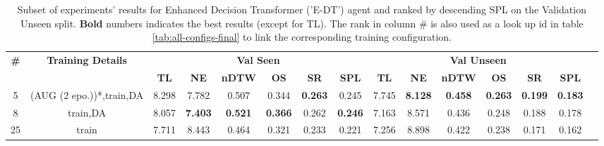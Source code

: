 \begin{table}
\centering
\caption{\label{tab:e_dt_final}Subset of experiments' results for Enhanced Decision Transformer ('E-DT') agent and ranked by descending SPL on the Validation Unseen split. \textbf{Bold} numbers indicates the best results (except for TL). The rank in column \# is also used as a look up id in table \ref{tab:all-configs-final} to link the corresponding training configuration.}
\begin{tabular}{@{\hskip3pt}c@{\hskip3pt}c@{\hskip3pt}c@{\hskip3pt}c@{\hskip3pt}c@{\hskip3pt}c@{\hskip3pt}c@{\hskip3pt}c@{\hskip3pt}c@{\hskip3pt}c@{\hskip3pt}c@{\hskip3pt}c@{\hskip3pt}c@{\hskip3pt}c@{\hskip3pt}c}
\toprule
                                  \textbf{\#} & \textbf{Training Details} & \multicolumn{6}{c}{\textbf{Val Seen}} & \multicolumn{6}{c}{\textbf{Val Unseen}} \\
\cmidrule(l){3-8}\cmidrule(l){9-14}\textbf{~} &                \textbf{~} &       \textbf{TL} &     \textbf{NE} &   \textbf{nDTW} &     \textbf{OS} &     \textbf{SR} &    \textbf{SPL} &         \textbf{TL} &     \textbf{NE} &   \textbf{nDTW} &     \textbf{OS} &     \textbf{SR} &    \textbf{SPL} \\
\midrule
                                            5 &  (AUG (2 epo.))*,train,DA &             8.298 &           7.782 &           0.507 &           0.344 &  \textbf{0.263} &           0.245 &               7.745 &  \textbf{8.128} &  \textbf{0.458} &  \textbf{0.263} &  \textbf{0.199} &  \textbf{0.183} \\
                                            8 &                  train,DA &             8.057 &  \textbf{7.403} &  \textbf{0.521} &  \textbf{0.366} &           0.262 &  \textbf{0.246} &               7.163 &           8.571 &           0.436 &           0.248 &           0.188 &           0.178 \\
                                           25 &                     train &             7.711 &           8.443 &           0.464 &           0.321 &           0.233 &           0.221 &               7.256 &           8.898 &           0.422 &           0.238 &           0.171 &           0.162 \\
\bottomrule
\end{tabular}
\end{table}
